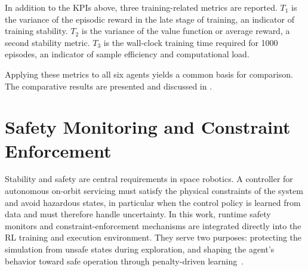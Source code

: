 \documentclass{ieeeaccess}
\begin{document}
In addition to the KPIs above, three training-related metrics are reported. $T_1$ is the
variance of the episodic reward in the late stage of training, an indicator of
training stability. $T_2$ is the variance of the value function or average reward, a
second stability metric. $T_3$ is the wall-clock training time required for 1000 episodes, an
indicator of sample efficiency and computational load.

Applying these metrics to all six agents yields a common basis for comparison. The
comparative results are presented and discussed in .

\section{Safety Monitoring and Constraint Enforcement}\label{formal}
Stability and safety are central requirements in space robotics. A controller for autonomous on-orbit
servicing must satisfy the physical constraints of the system and avoid hazardous states, in
particular when the control policy is learned from data and must therefore handle uncertainty.
In this work, runtime safety monitors and constraint-enforcement mechanisms are integrated directly into the
RL training and execution environment. They serve two purposes: protecting the simulation from unsafe
states during exploration, and shaping the agent's behavior toward safe operation through penalty-driven learning~\cite{b7,b22}.
\end{document}

